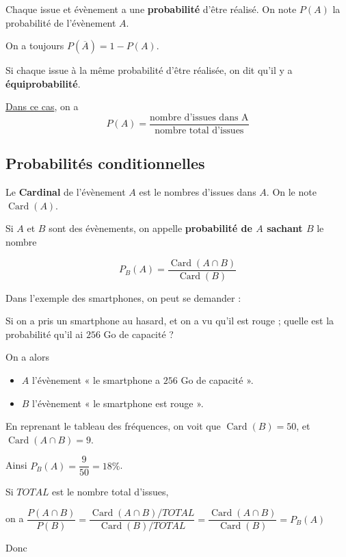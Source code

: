 \documentclass[
	classe=$1^{ere} STI2D$,
	headerTitle=Cours\space Chapitre\space 3
]{coursclass}
\DeclareMathOperator{\Card}{Card}
\begin{document}
\begin{definition}[Probabilités]
	Chaque issue et évènement a une \textbf{probabilité} d'être réalisé. On note $P(A)$ la probabilité de l'évènement $A$.
\end{definition}

\begin{remarque}
	On a toujours $P(\overline{A}) = 1 - P(A)$.
\end{remarque}

\begin{propriete}[Probabilités]
	Si chaque issue à la même probabilité d'être réalisée, on dit qu'il y a \textbf{équiprobabilité}.

	\uline{Dans ce cas}, on a
	$$ P(A) = \dfrac{\text{nombre d'issues dans A}}{\text{nombre total d'issues}} $$
\end{propriete}

\subsection*{Probabilités conditionnelles}

\begin{definition}[Cardinal]
	Le \textbf{Cardinal} de l'évènement $A$ est le nombres d'issues dans $A$. On le note $\Card(A)$.
\end{definition}

\begin{definition}
	Si $A$ et $B$ sont des évènements, on appelle \textbf{probabilité de $A$ sachant $B$} le nombre

	$$ P_B(A) = \dfrac{\Card(A ∩ B)}{\Card(B)} $$
\end{definition}

\begin{exemple}
	Dans l'exemple des smartphones, on peut se demander :

	Si on a pris un smartphone au hasard, et on a vu qu'il est rouge ; quelle est la probabilité qu'il ai $256$ Go de capacité ? \medskip

	On a alors
	\begin{itemize}
		\item $A$ l'évènement « le smartphone a $256$ Go de capacité ».
		\item $B$ l'évènement « le smartphone est rouge ».
	\end{itemize}

	En reprenant le tableau des fréquences, on voit que $\Card(B) = 50$, et $\Card(A ∩ B) = 9$.

	Ainsi $P_B(A) = \dfrac{9}{50} = 18\%$.
\end{exemple}

\begin{remarque}
	Si $TOTAL$ est le nombre total d'issues,\medskip

	on a $\dfrac{P(A ∩ B)}{P(B)} = \dfrac{\Card(A ∩ B)/TOTAL}{\Card(B)/TOTAL} = \dfrac{\Card(A ∩ B)}{\Card(B)} = P_B(A)$

	Donc

	\begin{center}
		\squared{$P_B(A) = \dfrac{\Card(A ∩ B)}{\Card(B)} = \dfrac{P(A ∩ B)}{P(B)}$}
	\end{center}
\end{remarque}
\end{document}
